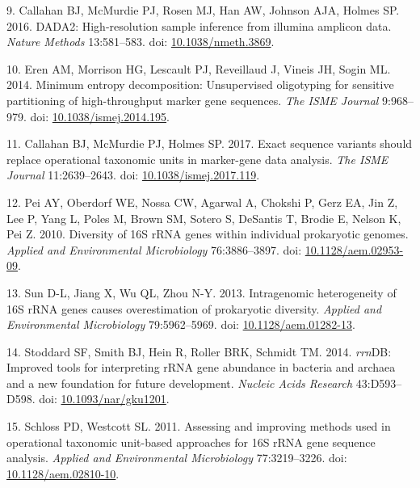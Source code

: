\documentclass[
]{article}
\newenvironment{cslreferences}%
  {}%
  {\par}
\begin{document}
\begin{cslreferences}
\leavevmode\hypertarget{ref-Callahan2016}{}%
9. Callahan BJ, McMurdie PJ, Rosen MJ, Han AW, Johnson AJA, Holmes SP.
2016. DADA2: High-resolution sample inference from illumina amplicon
data. \emph{Nature Methods} 13:581--583. doi:
\href{https://doi.org/10.1038/nmeth.3869}{10.1038/nmeth.3869}.

\leavevmode\hypertarget{ref-Eren2014}{}%
10. Eren AM, Morrison HG, Lescault PJ, Reveillaud J, Vineis JH, Sogin
ML. 2014. Minimum entropy decomposition: Unsupervised oligotyping for
sensitive partitioning of high-throughput marker gene sequences.
\emph{The ISME Journal} 9:968--979. doi:
\href{https://doi.org/10.1038/ismej.2014.195}{10.1038/ismej.2014.195}.

\leavevmode\hypertarget{ref-Callahan2017}{}%
11. Callahan BJ, McMurdie PJ, Holmes SP. 2017. Exact sequence variants
should replace operational taxonomic units in marker-gene data analysis.
\emph{The ISME Journal} 11:2639--2643. doi:
\href{https://doi.org/10.1038/ismej.2017.119}{10.1038/ismej.2017.119}.

\leavevmode\hypertarget{ref-Pei2010}{}%
12. Pei AY, Oberdorf WE, Nossa CW, Agarwal A, Chokshi P, Gerz EA, Jin Z,
Lee P, Yang L, Poles M, Brown SM, Sotero S, DeSantis T, Brodie E, Nelson
K, Pei Z. 2010. Diversity of 16S rRNA genes within individual
prokaryotic genomes. \emph{Applied and Environmental Microbiology}
76:3886--3897. doi:
\href{https://doi.org/10.1128/aem.02953-09}{10.1128/aem.02953-09}.

\leavevmode\hypertarget{ref-Sun2013}{}%
13. Sun D-L, Jiang X, Wu QL, Zhou N-Y. 2013. Intragenomic heterogeneity
of 16S rRNA genes causes overestimation of prokaryotic diversity.
\emph{Applied and Environmental Microbiology} 79:5962--5969. doi:
\href{https://doi.org/10.1128/aem.01282-13}{10.1128/aem.01282-13}.

\leavevmode\hypertarget{ref-Stoddard2014}{}%
14. Stoddard SF, Smith BJ, Hein R, Roller BRK, Schmidt TM. 2014.
\emph{rrn}DB: Improved tools for interpreting rRNA gene abundance in
bacteria and archaea and a new foundation for future development.
\emph{Nucleic Acids Research} 43:D593--D598. doi:
\href{https://doi.org/10.1093/nar/gku1201}{10.1093/nar/gku1201}.

\leavevmode\hypertarget{ref-Schloss2011}{}%
15. Schloss PD, Westcott SL. 2011. Assessing and improving methods used
in operational taxonomic unit-based approaches for 16S rRNA gene
sequence analysis. \emph{Applied and Environmental Microbiology}
77:3219--3226. doi:
\href{https://doi.org/10.1128/aem.02810-10}{10.1128/aem.02810-10}.


\end{cslreferences}
\end{document}
